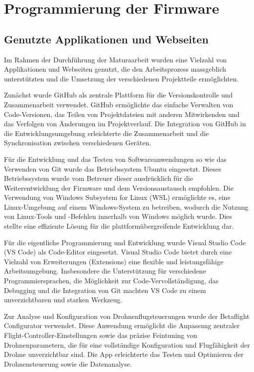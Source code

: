 \chapter{Programmierung der Firmware} \label{ch:Firmware}

\section{Genutzte Applikationen und Webseiten}

Im Rahmen der Durchführung der Maturaarbeit wurden eine Vielzahl von Applikationen und Webseiten genutzt, die den Arbeitsprozess massgeblich unterstützten und die Umsetzung der verschiedenen Projektteile ermöglichten. %

Zunächst wurde GitHub\cite{github} als zentrale Plattform für die Versionskontrolle und Zusammenarbeit verwendet. GitHub ermöglichte das einfache Verwalten von Code-Versionen, das Teilen von Projektdateien mit anderen Mitwirkenden und das Verfolgen von Änderungen im Projektverlauf. Die Integration von GitHub in die Entwicklungsumgebung erleichterte die Zusammenarbeit und die Synchronisation zwischen verschiedenen Geräten. 

Für die Entwicklung und das Testen von Softwareanwendungen so wie das Verwenden von Git wurde das Betriebssystem Ubuntu\cite{ubuntuWSL} eingesetzt. Dieses Betriebssystem wurde vom Betreuer dieser ausdrücklich für die Weiterentwicklung der Firmware und dem Versionsaustausch empfohlen. Die Verwendung von Windows Subsystem for Linux (WSL)\cite{ubuntuWSL} ermöglichte es, eine Linux-Umgebung auf einem Windows-System zu betreiben, wodurch die Nutzung von Linux-Tools und -Befehlen innerhalb von Windows möglich wurde. Dies stellte eine effiziente Lösung für die plattformübergreifende Entwicklung dar.

Für die eigentliche Programmierung und Entwicklung wurde Visual Studio Code (VS Code)\cite{microsoftstore} als Code-Editor eingesetzt. Visual Studio Code bietet durch eine Vielzahl von Erweiterungen (Extensions) eine flexible und leistungsfähige Arbeitsumgebung. Insbesondere die Unterstützung für verschiedene Programmiersprachen, die Möglichkeit zur Code-Vervollständigung, das Debugging und die Integration von Git machten VS Code zu einem unverzichtbaren und starken Werkzeug.

Zur Analyse und Konfiguration von Drohnenflugsteuerungen wurde der Betaflight Configurator\cite{betaflightapp} verwendet. Diese Anwendung ermöglicht die Anpassung zentraler Flight-Controller-Einstellungen sowie das präzise Feintuning von Drohnenparametern, die für eine vollständige Konfiguration und Flugfähigkeit der Drohne unverzichtbar sind. Die App erleichterte das Testen und Optimieren der Drohnensteuerung sowie die Datenanalyse.


